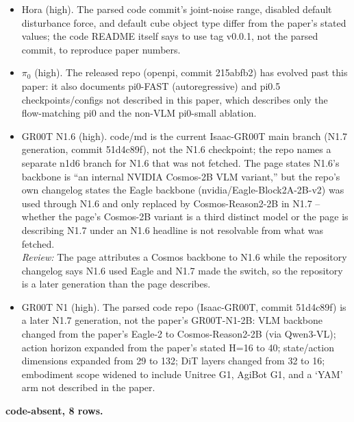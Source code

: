 \begin{itemize}
\item Hora \cite{hora_2022} (high). The parsed code commit's joint-noise range, disabled default disturbance force, and default cube object type differ from the paper's stated values; the code README itself says to use tag v0.0.1, not the parsed commit, to reproduce paper numbers.
\item $\pi_0$ \cite{pi0_2024} (high). The released repo (openpi, commit 215abfb2) has evolved past this paper: it also documents pi0-FAST (autoregressive) and pi0.5 checkpoints/configs not described in this paper, which describes only the flow-matching pi0 and the non-VLM pi0-small ablation.
\item GR00T N1.6 \cite{groot_n16_2025} (high). code/md is the current Isaac-GR00T main branch (N1.7 generation, commit 51d4c89f), not the N1.6 checkpoint; the repo names a separate n1d6 branch for N1.6 that was not fetched. The page states N1.6's backbone is ``an internal NVIDIA Cosmos-2B VLM variant,'' but the repo's own changelog states the Eagle backbone (nvidia/Eagle-Block2A-2B-v2) was used through N1.6 and only replaced by Cosmos-Reason2-2B in N1.7 -- whether the page's Cosmos-2B variant is a third distinct model or the page is describing N1.7 under an N1.6 headline is not resolvable from what was fetched.
  \\ \emph{Review:} The page attributes a Cosmos backbone to N1.6 while the repository changelog says N1.6 used Eagle and N1.7 made the switch, so the repository is a later generation than the page describes.
\item GR00T N1 \cite{groot_n1_2025} (high). The parsed code repo (Isaac-GR00T, commit 51d4c89f) is a later N1.7 generation, not the paper's GR00T-N1-2B: VLM backbone changed from the paper's Eagle-2 to Cosmos-Reason2-2B (via Qwen3-VL); action horizon expanded from the paper's stated H=16 to 40; state/action dimensions expanded from 29 to 132; DiT layers changed from 32 to 16; embodiment scope widened to include Unitree G1, AgiBot G1, and a `YAM' arm not described in the paper.
\end{itemize}

\textbf{code-absent, 8 rows.}

